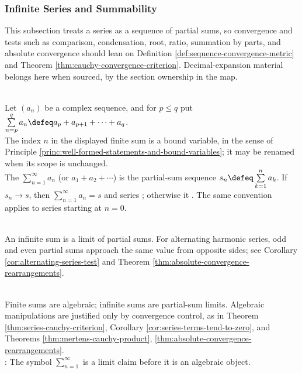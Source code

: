 \subsubsection{Infinite Series and Summability}


This subsection treats a series as a sequence of partial sums, so convergence and tests such as comparison, condensation, root, ratio, summation by parts, and absolute convergence should lean on Definition \ref{def:sequence-convergence-metric} and Theorem \ref{thm:cauchy-convergence-criterion}. Decimal-expansion material belongs here when sourced, by the section ownership in the map.

\begin{definition} \label{def:series-core-definitions-source-todo}\label{def:series-and-partial-sums} \\
Let $(a_n)$ be a complex sequence, and for $p\leq q$ put $\sum\limits_{n=p}^{q}a_n\defeq a_p+a_{p+1}+\cdots+a_q$.\\
The index $n$ in the displayed finite sum is a bound variable, in the sense of Principle \ref{princ:well-formed-statements-and-bound-variables}; it may be renamed when its scope is unchanged.\\
The  $\sum_{n=1}^{\infty}a_n$ (or $a_1+a_2+\cdots$) is the partial-sum sequence $s_n\defeq\sum\limits_{k=1}^{n}a_k$. If $s_n\to s$, then $\sum\limits_{n=1}^{\infty}a_n=s$ and series ; otherwise it . The same convention applies to series starting at $n=0$.
\end{definition}


\begin{motivation} \label{mot:partial-sums-remember-order} \\
An infinite sum is a limit of partial sums. For alternating harmonic series, odd and even partial sums approach the same value from opposite sides; see Corollary \ref{cor:alternating-series-test} and Theorem \ref{thm:absolute-convergence-rearrangements}.
\end{motivation}

\begin{perspective} \label{per:formal-series-algebra-needs-convergence} \\
Finite sums are algebraic; infinite sums are partial-sum limits. Algebraic manipulations are justified only by convergence control, as in Theorem \ref{thm:series-cauchy-criterion}, Corollary \ref{cor:series-terms-tend-to-zero}, and Theorems \ref{thm:mertens-cauchy-product}, \ref{thm:absolute-convergence-rearrangements}.\\
: The symbol $\sum_{n=1}^{\infty}$ is a limit claim before it is an algebraic object.
\end{perspective}

